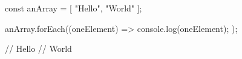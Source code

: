 const anArray = [ "Hello", "World" ];

anArray.forEach((oneElement) => {
    console.log(oneElement);
});

// Hello
// World